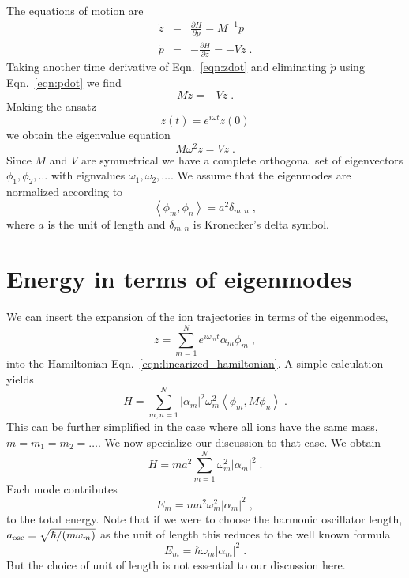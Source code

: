 \documentclass[aps, pra, preprint]{revtex4-1}
\begin{document}
The equations of motion are
\begin{eqnarray}
  \dot{z} &=& \frac{\partial H}{\partial p} = M^{-1}p\label{eqn:zdot}\\
  \dot{p} &=& -\frac{\partial H}{\partial z} = -Vz\label{eqn:pdot}\;.
\end{eqnarray}
Taking another time derivative of Eqn.~\eqref{eqn:zdot} and
eliminating $\dot{p}$ using Eqn.~\eqref{eqn:pdot} we find
\begin{equation}
  M\ddot{z}=-Vz\;.
\end{equation}
Making the ansatz
\begin{equation}
  z(t)=e^{i\omega t}z(0)
\end{equation}
we obtain the eigenvalue equation
\begin{equation}
  M\omega^2z = Vz\;.
\end{equation}
Since $M$ and $V$ are symmetrical we have a complete orthogonal
set of eigenvectors $\phi_1, \phi_2,\ldots$ with eignvalues
$\omega_1, \omega_2, \ldots$. We assume that the eigenmodes are
normalized according to
\begin{equation}
  \left\langle \phi_m,\phi_n\right \rangle = a^2\delta_{m,n}\;,
\end{equation}
where $a$ is the unit of length and $\delta_{m,n}$ is Kronecker's
delta symbol.


\section{Energy in terms of eigenmodes}

We can insert the expansion of the ion trajectories in terms of the
eigenmodes,
\begin{equation}
  z=\sum_{m=1}^N e^{i\omega_m t} \alpha_m \phi_m\;,
\end{equation}
into the Hamiltonian Eqn.~\eqref{eqn:linearized_hamiltonian}. A
simple calculation yields
\begin{equation}
  H=\sum_{m,n=1}^N\left| \alpha_m\right|^2
    \omega_m^2\left\langle \phi_m,M\phi_n \right\rangle\;.
\end{equation}
This can be further simplified in the case where all ions
have the same mass, $m=m_1=m_2=\ldots$. We now specialize our
discussion to that case. We obtain
\begin{equation}
  H=ma^2\sum_{m=1}^N\omega_m^2\left| \alpha_m \right|^2\;.
\end{equation}
Each mode contributes
\begin{equation}
  E_m=ma^2\omega_m^2\left| \alpha_m \right|^2\;,
  \label{eqn:ModeEnergy}
\end{equation}
to the total energy. Note that if we were to choose the harmonic
oscillator length, $a_{\rm osc}=\sqrt{\hbar/(m\omega_m)}$ as the
unit of length this reduces to the well known formula
\begin{equation}
  E_m=\hbar\omega_m\left| \alpha_m \right|^2\;.
\end{equation}
But the choice of unit of length is not essential to our discussion
here.
\end{document}
